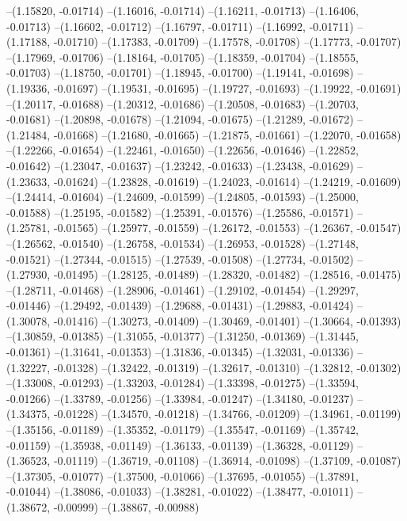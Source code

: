 --(1.15820, -0.01714)
--(1.16016, -0.01714)
--(1.16211, -0.01713)
--(1.16406, -0.01713)
--(1.16602, -0.01712)
--(1.16797, -0.01711)
--(1.16992, -0.01711)
--(1.17188, -0.01710)
--(1.17383, -0.01709)
--(1.17578, -0.01708)
--(1.17773, -0.01707)
--(1.17969, -0.01706)
--(1.18164, -0.01705)
--(1.18359, -0.01704)
--(1.18555, -0.01703)
--(1.18750, -0.01701)
--(1.18945, -0.01700)
--(1.19141, -0.01698)
--(1.19336, -0.01697)
--(1.19531, -0.01695)
--(1.19727, -0.01693)
--(1.19922, -0.01691)
--(1.20117, -0.01688)
--(1.20312, -0.01686)
--(1.20508, -0.01683)
--(1.20703, -0.01681)
--(1.20898, -0.01678)
--(1.21094, -0.01675)
--(1.21289, -0.01672)
--(1.21484, -0.01668)
--(1.21680, -0.01665)
--(1.21875, -0.01661)
--(1.22070, -0.01658)
--(1.22266, -0.01654)
--(1.22461, -0.01650)
--(1.22656, -0.01646)
--(1.22852, -0.01642)
--(1.23047, -0.01637)
--(1.23242, -0.01633)
--(1.23438, -0.01629)
--(1.23633, -0.01624)
--(1.23828, -0.01619)
--(1.24023, -0.01614)
--(1.24219, -0.01609)
--(1.24414, -0.01604)
--(1.24609, -0.01599)
--(1.24805, -0.01593)
--(1.25000, -0.01588)
--(1.25195, -0.01582)
--(1.25391, -0.01576)
--(1.25586, -0.01571)
--(1.25781, -0.01565)
--(1.25977, -0.01559)
--(1.26172, -0.01553)
--(1.26367, -0.01547)
--(1.26562, -0.01540)
--(1.26758, -0.01534)
--(1.26953, -0.01528)
--(1.27148, -0.01521)
--(1.27344, -0.01515)
--(1.27539, -0.01508)
--(1.27734, -0.01502)
--(1.27930, -0.01495)
--(1.28125, -0.01489)
--(1.28320, -0.01482)
--(1.28516, -0.01475)
--(1.28711, -0.01468)
--(1.28906, -0.01461)
--(1.29102, -0.01454)
--(1.29297, -0.01446)
--(1.29492, -0.01439)
--(1.29688, -0.01431)
--(1.29883, -0.01424)
--(1.30078, -0.01416)
--(1.30273, -0.01409)
--(1.30469, -0.01401)
--(1.30664, -0.01393)
--(1.30859, -0.01385)
--(1.31055, -0.01377)
--(1.31250, -0.01369)
--(1.31445, -0.01361)
--(1.31641, -0.01353)
--(1.31836, -0.01345)
--(1.32031, -0.01336)
--(1.32227, -0.01328)
--(1.32422, -0.01319)
--(1.32617, -0.01310)
--(1.32812, -0.01302)
--(1.33008, -0.01293)
--(1.33203, -0.01284)
--(1.33398, -0.01275)
--(1.33594, -0.01266)
--(1.33789, -0.01256)
--(1.33984, -0.01247)
--(1.34180, -0.01237)
--(1.34375, -0.01228)
--(1.34570, -0.01218)
--(1.34766, -0.01209)
--(1.34961, -0.01199)
--(1.35156, -0.01189)
--(1.35352, -0.01179)
--(1.35547, -0.01169)
--(1.35742, -0.01159)
--(1.35938, -0.01149)
--(1.36133, -0.01139)
--(1.36328, -0.01129)
--(1.36523, -0.01119)
--(1.36719, -0.01108)
--(1.36914, -0.01098)
--(1.37109, -0.01087)
--(1.37305, -0.01077)
--(1.37500, -0.01066)
--(1.37695, -0.01055)
--(1.37891, -0.01044)
--(1.38086, -0.01033)
--(1.38281, -0.01022)
--(1.38477, -0.01011)
--(1.38672, -0.00999)
--(1.38867, -0.00988)
